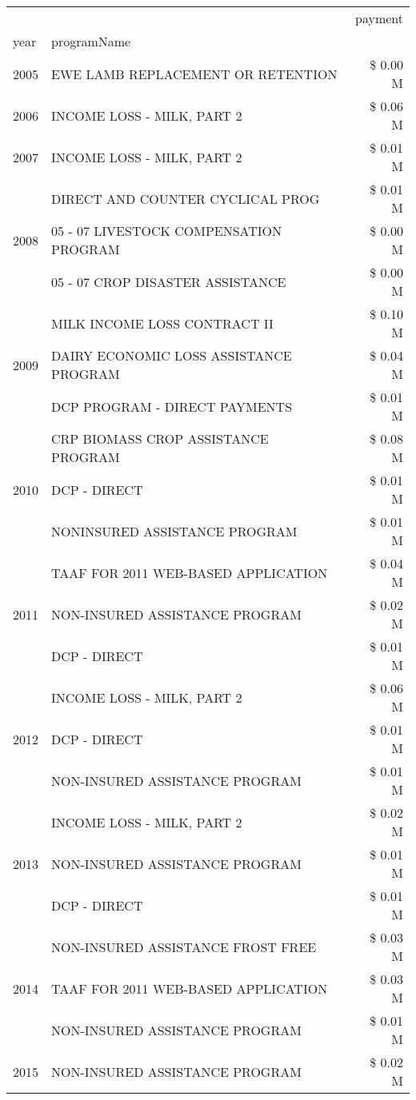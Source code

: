 \begin{tabular}{llr}
\toprule
 &  & payment \\
year & programName &  \\
\midrule
2005 & EWE LAMB REPLACEMENT OR RETENTION & \$ 0.00 M \\
\cline{1-3}
2006 & INCOME LOSS - MILK, PART 2 & \$ 0.06 M \\
\cline{1-3}
2007 & INCOME LOSS - MILK, PART 2 & \$ 0.01 M \\
\cline{1-3}
\multirow[t]{3}{*}{2008} & DIRECT AND COUNTER CYCLICAL PROG & \$ 0.01 M \\
 & 05 - 07 LIVESTOCK COMPENSATION PROGRAM & \$ 0.00 M \\
 & 05 - 07 CROP DISASTER ASSISTANCE & \$ 0.00 M \\
\cline{1-3}
\multirow[t]{3}{*}{2009} & MILK INCOME LOSS CONTRACT II & \$ 0.10 M \\
 & DAIRY ECONOMIC LOSS ASSISTANCE PROGRAM & \$ 0.04 M \\
 & DCP PROGRAM - DIRECT PAYMENTS & \$ 0.01 M \\
\cline{1-3}
\multirow[t]{3}{*}{2010} & CRP BIOMASS CROP ASSISTANCE PROGRAM & \$ 0.08 M \\
 & DCP - DIRECT & \$ 0.01 M \\
 & NONINSURED ASSISTANCE PROGRAM & \$ 0.01 M \\
\cline{1-3}
\multirow[t]{3}{*}{2011} & TAAF FOR 2011 WEB-BASED APPLICATION & \$ 0.04 M \\
 & NON-INSURED ASSISTANCE PROGRAM & \$ 0.02 M \\
 & DCP - DIRECT & \$ 0.01 M \\
\cline{1-3}
\multirow[t]{3}{*}{2012} & INCOME LOSS - MILK, PART 2 & \$ 0.06 M \\
 & DCP - DIRECT & \$ 0.01 M \\
 & NON-INSURED ASSISTANCE PROGRAM & \$ 0.01 M \\
\cline{1-3}
\multirow[t]{3}{*}{2013} & INCOME LOSS - MILK, PART 2 & \$ 0.02 M \\
 & NON-INSURED ASSISTANCE PROGRAM & \$ 0.01 M \\
 & DCP - DIRECT & \$ 0.01 M \\
\cline{1-3}
\multirow[t]{3}{*}{2014} & NON-INSURED ASSISTANCE FROST FREE & \$ 0.03 M \\
 & TAAF FOR 2011 WEB-BASED APPLICATION & \$ 0.03 M \\
 & NON-INSURED ASSISTANCE PROGRAM & \$ 0.01 M \\
\cline{1-3}
\multirow[t]{3}{*}{2015} & NON-INSURED ASSISTANCE PROGRAM & \$ 0.02 M \\

\end{tabular}
